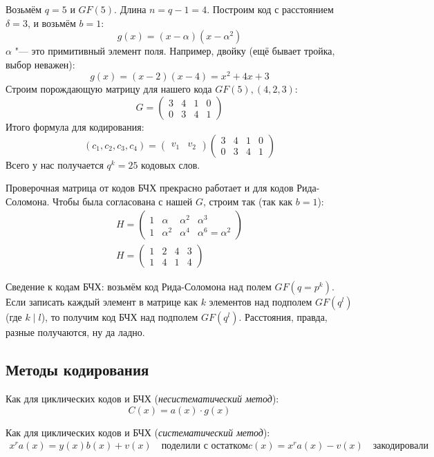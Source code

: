 \begin{exmp}
	Возьмём $q=5$ и $GF(5)$.
	Длина $n=q-1=4$.
	Построим код с расстоянием $\delta=3$, и возьмём $b=1$:
	\[
	g(x) = (x - \alpha)(x - \alpha^2)
	\]
	$\alpha$ "--- это примитивный элемент поля.
	Например, двойку (ещё бывает тройка, выбор неважен):
	\[
	g(x) = (x - 2)(x - 4) = x^2 + 4x + 3
	\]
	Строим порождающую матрицу для нашего кода $GF(5), (4, 2, 3)$:
	\[
	G =
	\begin{pmatrix}
	3 & 4 & 1 & 0 \\
	0 & 3 & 4 & 1
	\end{pmatrix}
	\]
	Итого формула для кодирования:
	\[
	(c_1, c_2, c_3, c_4) =
	\begin{pmatrix}
	v_1 & v_2
	\end{pmatrix}
	\begin{pmatrix}
	3 & 4 & 1 & 0 \\
	0 & 3 & 4 & 1
	\end{pmatrix}
	\]
	Всего у нас получается $q^k=25$ кодовых слов.

	Проверочная матрица от кодов БЧХ прекрасно работает и для кодов Рида-Соломона.
	Чтобы была согласована с нашей $G$, строим так (так как $b=1$):
	\begin{gather*}
	H = \begin{pmatrix}
	1 & \alpha & \alpha^2 & \alpha^3 \\
	1 & \alpha^2 & \alpha^4 & \alpha^6=\alpha^2
	\end{pmatrix} \\
	H = \begin{pmatrix}
	1 & 2 & 4 & 3 \\
	1 & 4 & 1 & 4
	\end{pmatrix}
	\end{gather*}
\end{exmp}

Сведение к кодам БЧХ: возьмём код Рида-Соломона над полем $GF(q=p^k)$.
Если записать каждый элемент в матрице как $k$ элементов над подполем $GF(q^l)$
(где $k \mid l$), то получим код БЧХ над подполем $GF(q^l)$.
Расстояния, правда, разные получаются, ну да ладно.

\subsection{Методы кодирования}
Как для циклических кодов и БЧХ (\textit{несистематический метод}):
\[
C(x) = a(x) \cdot g(x)
\]

Как для циклических кодов и БЧХ (\textit{систематический метод}):
\begin{gather*}
x^r a(x) = y(x) b(x) + v(x) \quad \text{поделили с остатком}
c(x) = x^r a(x) - v(x) \quad \text{закодировали}
\end{gather*}

